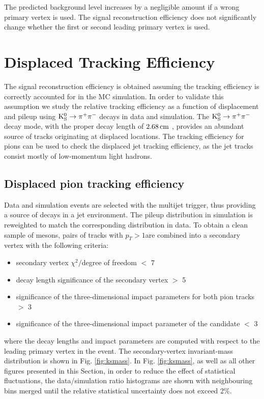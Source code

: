 The predicted background level increases by a negligible amount if a wrong primary vertex is used. The signal reconstruction efficiency 
does not significantly change whether the first or second leading primary vertex is used.

\section{Displaced Tracking Efficiency}

The signal reconstruction efficiency is obtained assuming the tracking efficiency is correctly 
accounted for in the MC simulation. In order to validate this assumption we study
the relative tracking efficiency as a function of displacement and pileup using
$\mathrm{K}^0_\mathrm{S} \to \pi^+\pi^-$ decays in data and simulation.
The $\mathrm{K}^0_\mathrm{S} \to \pi^+\pi^-$ decay mode, with the \Kshort proper decay length of $2.68 \,\text{cm}$
 \cite{Beringer:1900zz}, provides an abundant source of tracks originating
at displaced locations. 
The tracking efficiency for \Kshort pions can be used to check the displaced jet tracking efficiency, 
as the jet tracks consist mostly of low-momentum light hadrons. 

\subsection{Displaced pion tracking efficiency}
\label{subsec:pitrkeff}

Data and simulation events are selected with the multijet trigger, thus providing
a source of \Kshort decays in a jet environment. The pileup distribution in simulation is reweighted
to match the corresponding distribution in data. 
To obtain a clean sample of \Kshort mesons, pairs of tracks with $p_T>1$\GeV are combined
 into a secondary 
vertex with the following criteria:
\begin{itemize}
 \item secondary vertex $\chi^2/$degree of freedom $<$ 7
 \item decay length significance of the secondary vertex $>$ 5
 \item significance of the three-dimensional impact parameters for both pion tracks $>$ 3
 \item significance of the three-dimensional impact parameter of the \Kshort candidate $<$ 3 
\end{itemize}
where the decay lengths and impact parameters are computed with respect to the leading primary vertex
in the event.
The secondary-vertex invariant-mass distribution is shown in Fig. \ref{fig:ksmass}. 
In Fig. \ref{fig:ksmass}, as well as all other figures
presented in this Section, in order to reduce the effect of statistical fluctuations, 
the data/simulation ratio histograms are shown with neighbouring bins merged until the
relative statistical uncertainty does not exceed 2\%. 

